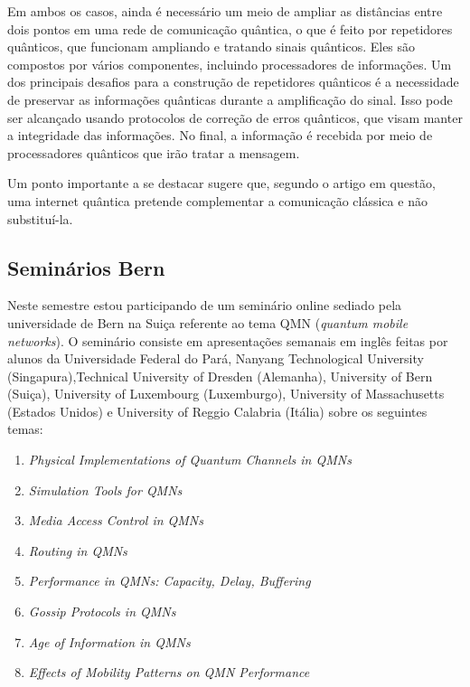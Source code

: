 \documentclass{article}
\begin{document}
        Em ambos os casos, ainda é necessário um meio de ampliar as distâncias entre dois pontos em uma rede de comunicação quântica, o que é feito por repetidores quânticos, que funcionam ampliando e tratando sinais quânticos. Eles são compostos por vários componentes, incluindo processadores de informações. Um dos principais desafios para a construção de repetidores quânticos é a necessidade de preservar as informações quânticas durante a amplificação do sinal. Isso pode ser alcançado usando protocolos de correção de erros quânticos, que visam manter a integridade das informações. No final, a informação é recebida por meio de processadores quânticos que irão tratar a mensagem. 
        
        Um ponto importante a se destacar sugere que, segundo o artigo em questão, uma internet quântica pretende complementar a comunicação clássica e não substituí-la.  


    \subsection{Seminários Bern}
        Neste semestre estou participando de um seminário online sediado pela universidade de Bern na Suiça referente ao tema QMN (\emph{quantum mobile networks}). O seminário consiste em apresentações semanais em inglês feitas por alunos da Universidade Federal do Pará, Nanyang Technological University (Singapura),Technical University of Dresden (Alemanha), University of Bern (Suiça), University of Luxembourg (Luxemburgo), University of Massachusetts (Estados Unidos) e University of Reggio Calabria (Itália) sobre os seguintes temas:

        \begin{enumerate}
            \item \emph{Physical Implementations of Quantum Channels in QMNs} 
            \item \emph{Simulation Tools for QMNs}
            \item \emph{Media Access Control in QMNs} 
            \item \emph{Routing in QMNs}
            \item \emph{Performance in QMNs: Capacity, Delay, Buffering} 
            \item \emph{Gossip Protocols in QMNs}
            \item \emph{Age of Information in QMNs}
            \item \emph{Effects of Mobility Patterns on QMN Performance}  
        \end{enumerate}
\end{document}
